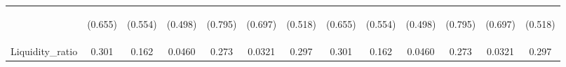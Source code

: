 \documentclass[]{article}
\begin{document}
\begin{center}
\begin{tabular}{lcccccccccccc}
\vspace{4pt} & \begin{footnotesize}(0.655)\end{footnotesize} & \begin{footnotesize}(0.554)\end{footnotesize} & \begin{footnotesize}(0.498)\end{footnotesize} & \begin{footnotesize}(0.795)\end{footnotesize} & \begin{footnotesize}(0.697)\end{footnotesize} & \begin{footnotesize}(0.518)\end{footnotesize} & \begin{footnotesize}(0.655)\end{footnotesize} & \begin{footnotesize}(0.554)\end{footnotesize} & \begin{footnotesize}(0.498)\end{footnotesize} & \begin{footnotesize}(0.795)\end{footnotesize} & \begin{footnotesize}(0.697)\end{footnotesize} & \begin{footnotesize}(0.518)\end{footnotesize} \\
Liquidity\_ratio & 0.301 & 0.162 & 0.0460 & 0.273 & 0.0321 & 0.297 & 0.301 & 0.162 & 0.0460 & 0.273 & 0.0321 & 0.297 \\

\end{tabular}
\end{center}
\end{document}
